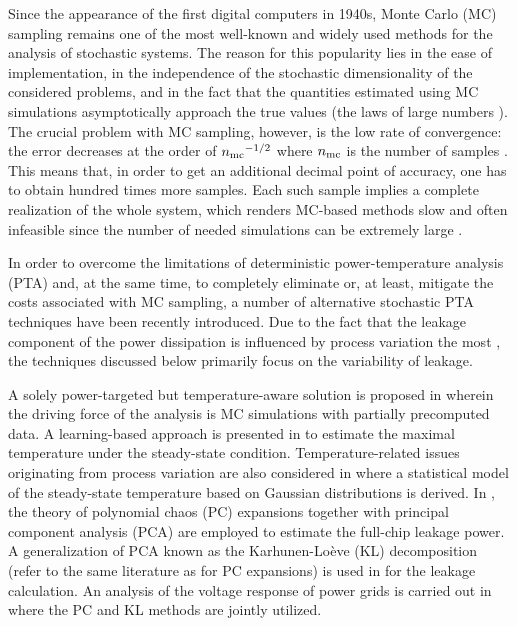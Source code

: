 Since the appearance of the first digital computers in 1940s, Monte Carlo (MC) sampling remains one of the most well-known and widely used methods for the analysis of stochastic systems.
The reason for this popularity lies in the ease of implementation, in the independence of the stochastic dimensionality of the considered problems, and in the fact that the quantities estimated using MC simulations asymptotically approach the true values (the laws of large numbers \cite{durrett2010}).
The crucial problem with MC sampling, however, is the low rate of convergence: the error decreases at the order of ${n_\text{mc}}^{-1/2}$ where ${n_\text{mc}}$ is the number of samples \cite{xiu2010, maitre2010}.
This means that, in order to get an additional decimal point of accuracy, one has to obtain hundred times more samples.
Each such sample implies a complete realization of the whole system, which renders MC-based methods slow and often infeasible since the number of needed simulations can be extremely large \cite{diaz-emparanza2002}.

In order to overcome the limitations of deterministic power-temperature analysis (PTA) and, at the same time, to completely eliminate or, at least, mitigate the costs associated with MC sampling, a number of alternative stochastic PTA techniques have been recently introduced.
Due to the fact that the leakage component of the power dissipation is influenced by process variation the most \cite{chandrakasan2001, srivastava2010, juan2011, juan2012}, the techniques discussed below primarily focus on the variability of leakage.

A solely power-targeted but temperature-aware solution is proposed in \cite{chandra2010} wherein the driving force of the analysis is MC simulations with partially precomputed data.
A learning-based approach is presented in \cite{juan2011} to estimate the maximal temperature under the steady-state condition.
Temperature-related issues originating from process variation are also considered in \cite{juan2012} where a statistical model of the steady-state temperature based on Gaussian distributions is derived.
In \cite{shen2009}, the theory of polynomial chaos (PC) expansions \cite{xiu2010, maitre2010, ghanem1991, eldred2008} together with principal component analysis (PCA) are employed to estimate the full-chip leakage power.
A generalization of PCA known as the Karhunen-Lo\`{e}ve (KL) decomposition (refer to the same literature as for PC expansions) is used in \cite{bhardwaj2006} for the leakage calculation.
An analysis of the voltage response of power grids is carried out in \cite{ghanta2006} where the PC and KL methods are jointly utilized.

